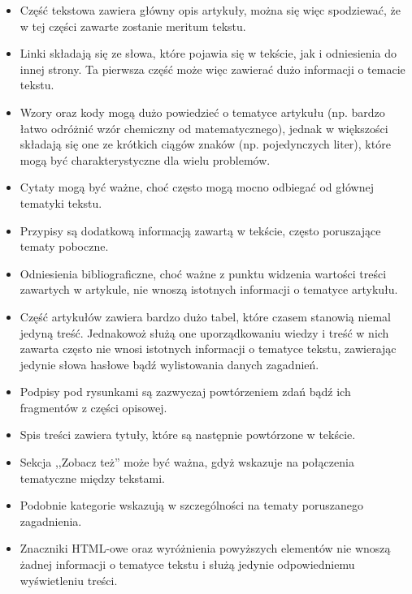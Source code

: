 \documentclass{praca1}
\begin{document}
\begin{itemize}
\item Część tekstowa zawiera główny opis artykuły, można się więc spodziewać, że w tej części zawarte zostanie meritum tekstu.
\item Linki składają się ze słowa, które pojawia się w tekście, jak i odniesienia do innej strony. Ta pierwsza część może więc zawierać dużo informacji o temacie tekstu.
\item Wzory oraz kody mogą dużo powiedzieć o tematyce artykułu (np. bardzo łatwo odróżnić wzór chemiczny od matematycznego), jednak w większości składają się one ze krótkich ciągów znaków (np. pojedynczych liter), które mogą być charakterystyczne dla wielu problemów.
\item Cytaty mogą być ważne, choć często mogą mocno odbiegać od głównej tematyki tekstu.
\item Przypisy są dodatkową informacją zawartą w tekście, często poruszające tematy poboczne.
\item Odniesienia bibliograficzne, choć ważne z punktu widzenia wartości treści zawartych w artykule, nie wnoszą istotnych informacji o tematyce artykułu.
\item Część artykułów zawiera bardzo dużo tabel, które czasem stanowią niemal jedyną treść. Jednakowoż służą one uporządkowaniu wiedzy i treść w nich zawarta często nie wnosi istotnych informacji o tematyce tekstu, zawierając jedynie słowa hasłowe bądź wylistowania danych zagadnień.
\item Podpisy pod rysunkami są zazwyczaj powtórzeniem zdań bądź ich fragmentów z części opisowej.
\item Spis treści zawiera tytuły, które są następnie powtórzone w tekście.
\item Sekcja ,,Zobacz też'' może być ważna, gdyż wskazuje na połączenia tematyczne między tekstami.
\item Podobnie kategorie wskazują w szczególności na tematy poruszanego zagadnienia.
\item Znaczniki HTML-owe oraz wyróżnienia powyższych elementów nie wnoszą żadnej informacji o tematyce tekstu i służą jedynie odpowiedniemu wyświetleniu treści.
\end{itemize}
\end{document}

